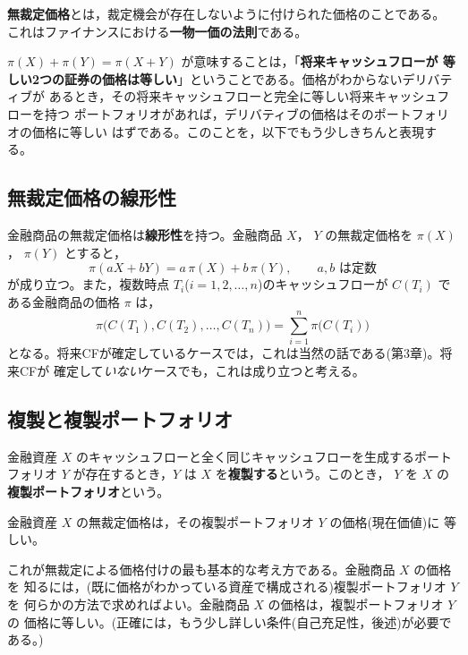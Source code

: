 \begin{definition}[無裁定価格]
\textbf{無裁定価格}とは，裁定機会が存在しないように付けられた価格のことである。
これはファイナンスにおける\textbf{一物一価の法則}である。
\end{definition}

$\pi(X)+\pi(Y) = \pi(X+Y)$ が意味することは，「\textbf{将来キャッシュフローが
等しい2つの証券の価格は等しい}」ということである。価格がわからないデリバティブが
あるとき，その将来キャッシュフローと完全に等しい将来キャッシュフローを持つ
ポートフォリオがあれば，デリバティブの価格はそのポートフォリオの価格に等しい
はずである。このことを，以下でもう少しきちんと表現する。

\subsection{無裁定価格の線形性}

金融商品の無裁定価格は\textbf{線形性}を持つ。金融商品 $X$， $Y$ の無裁定価格を
$\pi(X)$， $\pi(Y)$ とすると，
\begin{equation}
\pi(aX + bY) = a\,\pi(X) + b\,\pi(Y),\qquad a, b \text{ は定数}
\end{equation}
が成り立つ。また，複数時点 $T_i$($i=1,2,\dots,n$)のキャッシュフローが
$C(T_i)$ である金融商品の価格 $\pi$ は，
\begin{equation}
\pi\bigl(C(T_1), C(T_2),\dots,C(T_n)\bigr) = \sum_{i=1}^{n}\pi\bigl(C(T_i)\bigr)
\end{equation}
となる。将来CFが確定しているケースでは，これは当然の話である(第3章)。将来CFが
確定して\emph{いない}ケースでも，これは成り立つと考える。

\subsection{複製と複製ポートフォリオ}

\begin{definition}[複製]
金融資産 $X$ のキャッシュフローと全く同じキャッシュフローを生成するポート
フォリオ $Y$ が存在するとき，$Y$ は $X$ を\textbf{複製する}という。このとき，
$Y$ を $X$ の\textbf{複製ポートフォリオ}という。
\end{definition}

\begin{keypoint}[無裁定による価格付けの基本原理]
金融資産 $X$ の無裁定価格は，その複製ポートフォリオ $Y$ の価格(現在価値)に
等しい。

これが無裁定による価格付けの最も基本的な考え方である。金融商品 $X$ の価格を
知るには，(既に価格がわかっている資産で構成される)複製ポートフォリオ $Y$ を
何らかの方法で求めればよい。金融商品 $X$ の価格は，複製ポートフォリオ $Y$ の
価格に等しい。(正確には，もう少し詳しい条件(自己充足性，後述)が必要である。)
\end{keypoint}

